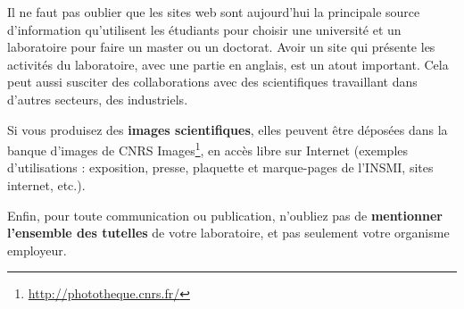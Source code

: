 \smallskip\par
Il ne faut pas oublier que les sites web sont aujourd'hui la principale source d'information qu'utilisent
 les \'etudiants pour choisir une universit\'e et un laboratoire pour faire un master ou un doctorat. Avoir
 un site qui pr\'esente les activit\'es du laboratoire, avec une partie en anglais, est un atout important.
Cela peut aussi susciter des collaborations avec des scientifiques travaillant dans d'autres secteurs, des industriels.


\medskip
Si vous produisez des \textbf{images scientifiques}, elles peuvent \^etre d\'epos\'ees dans la banque d'images de CNRS Images\footnote{\url{http://phototheque.cnrs.fr/}}, en acc\`es libre sur Internet (exemples d'utilisations : exposition, presse, plaquette et marque-pages de l'INSMI, sites internet, etc.).

\medskip
Enfin, pour toute communication ou publication, n'oubliez pas de \textbf{mentionner
l'ensemble des tutelles} de votre laboratoire, et pas seulement votre organisme employeur.
